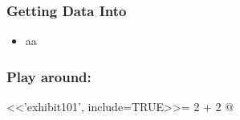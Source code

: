
\begin{frame}[label=TitlePage]
\maketitle%
\end{frame}


\begin{frame}[fragile]
\frametitle{Getting Data Into \Rlogo}
\begin{itemize}
\item aa
\end{itemize}
\end{frame}


\begin{frame}[fragile]%
\frametitle{Play around:}
<<'exhibit101', include=TRUE>>=
  2 + 2
@
\end{frame}

